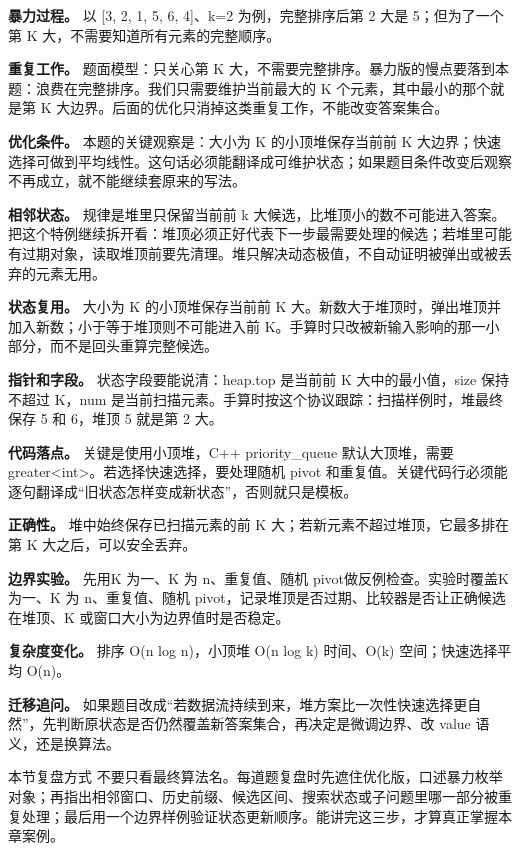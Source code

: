\textbf{暴力过程。} 以 [3, 2, 1, 5, 6, 4]、k=2 为例，完整排序后第 2 大是 5；但为了一个第 K 大，不需要知道所有元素的完整顺序。

\textbf{重复工作。} 题面模型：只关心第 K 大，不需要完整排序。暴力版的慢点要落到本题：浪费在完整排序。我们只需要维护当前最大的 K 个元素，其中最小的那个就是第 K 大边界。后面的优化只消掉这类重复工作，不能改变答案集合。

\textbf{优化条件。} 本题的关键观察是：大小为 K 的小顶堆保存当前前 K 大边界；快速选择可做到平均线性。这句话必须能翻译成可维护状态；如果题目条件改变后观察不再成立，就不能继续套原来的写法。

\textbf{相邻状态。} 规律是堆里只保留当前前 k 大候选，比堆顶小的数不可能进入答案。把这个特例继续拆开看：堆顶必须正好代表下一步最需要处理的候选；若堆里可能有过期对象，读取堆顶前要先清理。堆只解决动态极值，不自动证明被弹出或被丢弃的元素无用。

\textbf{状态复用。} 大小为 K 的小顶堆保存当前前 K 大。新数大于堆顶时，弹出堆顶并加入新数；小于等于堆顶则不可能进入前 K。手算时只改被新输入影响的那一小部分，而不是回头重算完整候选。

\textbf{指针和字段。} 状态字段要能说清：heap.top 是当前前 K 大中的最小值，size 保持不超过 K，num 是当前扫描元素。手算时按这个协议跟踪：扫描样例时，堆最终保存 5 和 6，堆顶 5 就是第 2 大。

\textbf{代码落点。} 关键是使用小顶堆，C++ priority\_queue 默认大顶堆，需要 greater<int>。若选择快速选择，要处理随机 pivot 和重复值。关键代码行必须能逐句翻译成“旧状态怎样变成新状态”，否则就只是模板。

\textbf{正确性。} 堆中始终保存已扫描元素的前 K 大；若新元素不超过堆顶，它最多排在第 K 大之后，可以安全丢弃。

\textbf{边界实验。} 先用K 为一、K 为 n、重复值、随机 pivot做反例检查。实验时覆盖K 为一、K 为 n、重复值、随机 pivot，记录堆顶是否过期、比较器是否让正确候选在堆顶、K 或窗口大小为边界值时是否稳定。

\textbf{复杂度变化。} 排序 O(n log n)，小顶堆 O(n log k) 时间、O(k) 空间；快速选择平均 O(n)。

\textbf{迁移追问。} 如果题目改成“若数据流持续到来，堆方案比一次性快速选择更自然”，先判断原状态是否仍然覆盖新答案集合，再决定是微调边界、改 value 语义，还是换算法。

\begin{principlebox}{本节复盘方式}
不要只看最终算法名。每道题复盘时先遮住优化版，口述暴力枚举对象；再指出相邻窗口、历史前缀、候选区间、搜索状态或子问题里哪一部分被重复处理；最后用一个边界样例验证状态更新顺序。能讲完这三步，才算真正掌握本章案例。
\end{principlebox}
